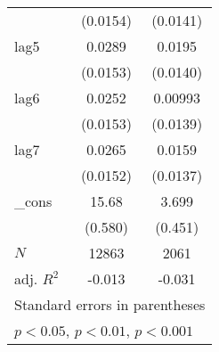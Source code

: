 {\begin{tabular}{l*{2}{c}}
            &    (0.0154)         &    (0.0141)         \\
[1em]
lag5        &      0.0289         &      0.0195         \\
            &    (0.0153)         &    (0.0140)         \\
[1em]
lag6        &      0.0252         &     0.00993         \\
            &    (0.0153)         &    (0.0139)         \\
[1em]
lag7        &      0.0265         &      0.0159         \\
            &    (0.0152)         &    (0.0137)         \\
[1em]
\_cons      &       15.68\sym{***}&       3.699\sym{***}\\
            &     (0.580)         &     (0.451)         \\
\hline
\(N\)       &       12863         &        2061         \\
adj. \(R^{2}\)&      -0.013         &      -0.031         \\
\hline\hline
\multicolumn{3}{l}{\footnotesize Standard errors in parentheses}\\
\multicolumn{3}{l}{\footnotesize \sym{*} \(p<0.05\), \sym{**} \(p<0.01\), \sym{***} \(p<0.001\)}\\
\end{tabular}
}
